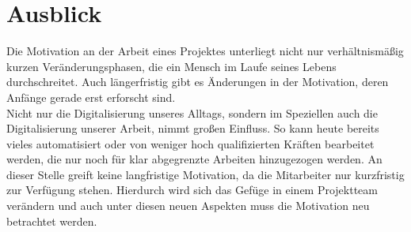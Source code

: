 \documentclass[12pt,a4paper]{scrreprt}
\begin{document}
\section{Ausblick}
Die Motivation an der Arbeit eines Projektes unterliegt nicht nur verhältnismäßig kurzen Veränderungsphasen, die ein Mensch im Laufe seines Lebens durchschreitet. Auch längerfristig gibt es Änderungen in der Motivation, deren Anfänge gerade erst erforscht sind. \\  
Nicht nur die Digitalisierung unseres Alltags, sondern im Speziellen auch die Digitalisierung unserer Arbeit, nimmt großen Einfluss. So kann heute bereits vieles automatisiert oder von weniger hoch qualifizierten Kräften bearbeitet werden, die nur noch für klar abgegrenzte Arbeiten hinzugezogen werden. An dieser Stelle greift keine langfristige Motivation, da die Mitarbeiter nur kurzfristig zur Verfügung stehen. Hierdurch wird sich das Gefüge in einem Projektteam verändern und auch unter diesen neuen Aspekten muss die Motivation neu betrachtet werden.


\renewcommand{\bibname}{Quellen}

\thispagestyle{fancy}
\end{document}
